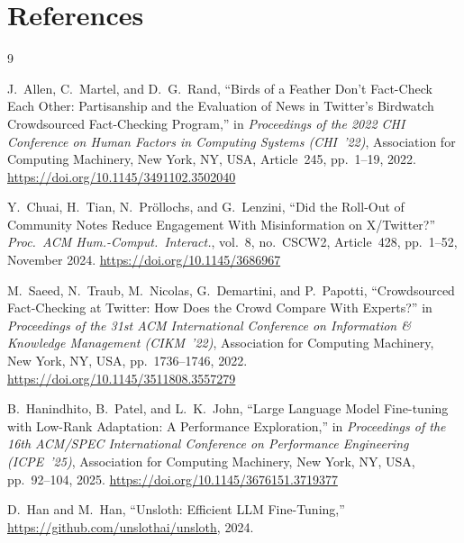 \documentclass[12pt, a4paper]{article}
\begin{document}
\section*{References}

\begin{thebibliography}{9}

J.~Allen, C.~Martel, and D.~G.~Rand,
``Birds of a Feather Don't Fact-Check Each Other: Partisanship and the Evaluation of News in Twitter's Birdwatch Crowdsourced Fact-Checking Program,''
in \emph{Proceedings of the 2022 CHI Conference on Human Factors in Computing Systems (CHI~'22)},
Association for Computing Machinery, New York, NY, USA, Article~245, pp.~1--19, 2022.
\url{https://doi.org/10.1145/3491102.3502040}

Y.~Chuai, H.~Tian, N.~Pr\"{o}llochs, and G.~Lenzini,
``Did the Roll-Out of Community Notes Reduce Engagement With Misinformation on X/Twitter?''
\emph{Proc.\ ACM Hum.-Comput.\ Interact.}, vol.~8, no.~CSCW2, Article~428, pp.~1--52, November 2024.
\url{https://doi.org/10.1145/3686967}

M.~Saeed, N.~Traub, M.~Nicolas, G.~Demartini, and P.~Papotti,
``Crowdsourced Fact-Checking at Twitter: How Does the Crowd Compare With Experts?''
in \emph{Proceedings of the 31st ACM International Conference on Information \& Knowledge Management (CIKM~'22)},
Association for Computing Machinery, New York, NY, USA, pp.~1736--1746, 2022.
\url{https://doi.org/10.1145/3511808.3557279}

B.~Hanindhito, B.~Patel, and L.~K.~John,
``Large Language Model Fine-tuning with Low-Rank Adaptation: A Performance Exploration,''
in \emph{Proceedings of the 16th ACM/SPEC International Conference on Performance Engineering (ICPE~'25)},
Association for Computing Machinery, New York, NY, USA, pp.~92--104, 2025.
\url{https://doi.org/10.1145/3676151.3719377}

D.~Han and M.~Han,
``Unsloth: Efficient LLM Fine-Tuning,''
\url{https://github.com/unslothai/unsloth}, 2024.


\end{thebibliography}
\end{document}
